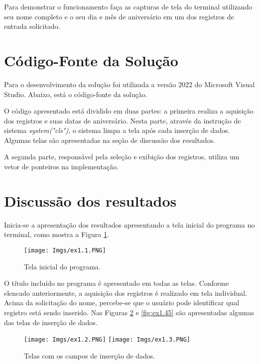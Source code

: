 \documentclass[
	12pt,				%
	openright,			%
	oneside,			%
	a4paper,			%
	chapter=TITLE,		%
	section=TITLE,		%
	english,			%
	french,				%
	spanish,			%
	brazil				%
	]{abntex2}
\begin{document}
	Para demonstrar o funcionamento faça as capturas de tela do terminal utilizando seu nome completo e o seu dia e mês de aniversário em um dos registros de entrada solicitado.

\section[CÓDIGO-FONTE DA SOLUÇÃO]{Código-Fonte da Solução}

	Para o desenvolvimento da solução foi utilizada a versão 2022 do Microsoft Visual Studio. Abaixo, está o código-fonte da solução.

		
	
	O código apresentado está dividido em duas partes: a primeira realiza a aquisição dos registros e suas datas de aniversário. Nesta parte, através da instrução de sistema \emph{system("cls")}, o sistema limpa a tela após cada inserção de dados. Algumas telas são apresentadas na seção de discussão dos resultados.
	
	A segunda parte, responsável pela seleção e exibição dos registros, utiliza um vetor de ponteiros na implementação. 


\section[DISCUSSÃO DOS RESULTADOS]{Discussão dos resultados}

	Inicia-se a apresentação dos resultados apresentando a tela inicial do programa no terminal, como mostra a Figura \ref{fig:ex1.1}.

	\begin{figure}[htpb]
		\centering
		\caption{Tela inicial do programa.}
		\texttt{[image: Imgs/ex1.1.PNG]}
		\label{fig:ex1.1}
	\end{figure}

	O título incluído no programa é apresentado em todas as telas. Conforme elencado anteriormente, a aquisição dos registros é realizado em tela individual. Acima da solicitação do nome, percebe-se que o usuário pode identificar qual registro está sendo inserido. Nas Figuras \ref{fig:ex1.23} e \ref{fig:ex1.45} são apresentadas algumas das telas de inserção de dados.

	\begin{figure}[htb]
		\begin{center}
			\caption{Telas com os campos de inserção de dados.}
			\label{fig:ex1.23}
			\texttt{[image: Imgs/ex1.2.PNG]} \quad
			\texttt{[image: Imgs/ex1.3.PNG]} \quad
		\end{center}
	\end{figure}
\end{document}
